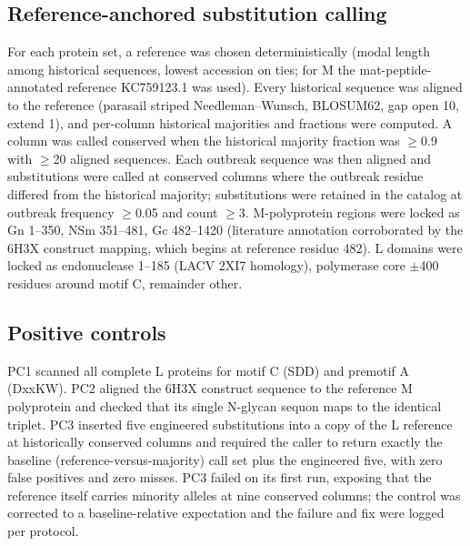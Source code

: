 \documentclass[12pt]{article}
\begin{document}
\subsection{Reference-anchored substitution calling}
For each protein set, a reference was chosen deterministically (modal length among historical sequences, lowest accession on ties; for M the mat-peptide-annotated reference KC759123.1 was used). Every historical sequence was aligned to the reference (parasail striped Needleman--Wunsch, BLOSUM62, gap open 10, extend 1), and per-column historical majorities and fractions were computed. A column was called conserved when the historical majority fraction was $\geq$0.9 with $\geq$20 aligned sequences. Each outbreak sequence was then aligned and substitutions were called at conserved columns where the outbreak residue differed from the historical majority; substitutions were retained in the catalog at outbreak frequency $\geq$0.05 and count $\geq$3. M-polyprotein regions were locked as Gn 1--350, NSm 351--481, Gc 482--1420 (literature annotation corroborated by the 6H3X construct mapping, which begins at reference residue 482). L domains were locked as endonuclease 1--185 (LACV 2XI7 homology), polymerase core $\pm$400 residues around motif C, remainder other.

\subsection{Positive controls}
PC1 scanned all complete L proteins for motif C (SDD) and premotif A (DxxKW). PC2 aligned the 6H3X construct sequence to the reference M polyprotein and checked that its single N-glycan sequon maps to the identical triplet. PC3 inserted five engineered substitutions into a copy of the L reference at historically conserved columns and required the caller to return exactly the baseline (reference-versus-majority) call set plus the engineered five, with zero false positives and zero misses. PC3 failed on its first run, exposing that the reference itself carries minority alleles at nine conserved columns; the control was corrected to a baseline-relative expectation and the failure and fix were logged per protocol.
\end{document}

